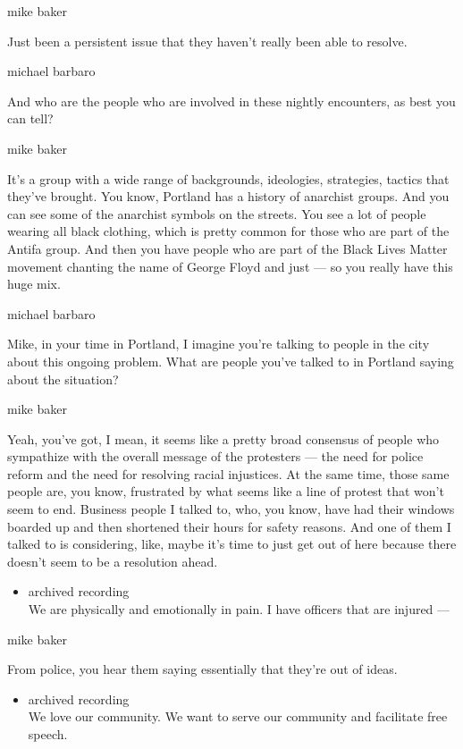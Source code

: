 mike baker

Just been a persistent issue that they haven't really been able to
resolve.

michael barbaro

And who are the people who are involved in these nightly encounters, as
best you can tell?

mike baker

It's a group with a wide range of backgrounds, ideologies, strategies,
tactics that they've brought. You know, Portland has a history of
anarchist groups. And you can see some of the anarchist symbols on the
streets. You see a lot of people wearing all black clothing, which is
pretty common for those who are part of the Antifa group. And then you
have people who are part of the Black Lives Matter movement chanting the
name of George Floyd and just --- so you really have this huge mix.

michael barbaro

Mike, in your time in Portland, I imagine you're talking to people in
the city about this ongoing problem. What are people you've talked to in
Portland saying about the situation?

mike baker

Yeah, you've got, I mean, it seems like a pretty broad consensus of
people who sympathize with the overall message of the protesters --- the
need for police reform and the need for resolving racial injustices. At
the same time, those same people are, you know, frustrated by what seems
like a line of protest that won't seem to end. Business people I talked
to, who, you know, have had their windows boarded up and then shortened
their hours for safety reasons. And one of them I talked to is
considering, like, maybe it's time to just get out of here because there
doesn't seem to be a resolution ahead.

\begin{itemize}
\tightlist
\item
  archived recording\\
  We are physically and emotionally in pain. I have officers that are
  injured ---
\end{itemize}

mike baker

From police, you hear them saying essentially that they're out of ideas.

\begin{itemize}
\tightlist
\item
  archived recording\\
  We love our community. We want to serve our community and facilitate
  free speech.
\end{itemize}

